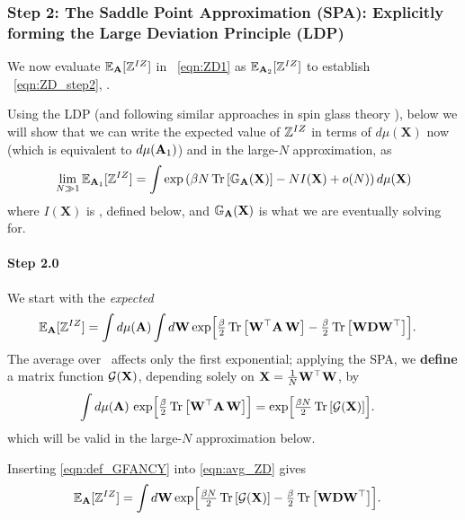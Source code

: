 \subsubsection{Step 2: The Saddle Point Approximation (SPA): Explicitly forming the Large Deviation Principle (LDP)}
\label{sxn:tanaka_step2}
We now evaluate $\mathbb{E}_{\mathbf{A}}[\mathbb{Z}^{IZ}]$ in \EQN~\ref{eqn:ZD1} as $\mathbb{E}_{\mathbf{A}_2}[\mathbb{Z}^{IZ}]$ 
to  establish \EQN~\ref{eqn:ZD_step2}, .

Using the LDP (and following similar approaches in spin glass theory \cite{PP95}),
below we will show that we can write the expected value of $\mathbb{Z}^{IZ}$ 
in terms of $d\mu(\mathbf{X})$ now (which is equivalent to $d\mu(\mathbf{A}_{1})$)
and in the large-$N$ approximation, as
\begin{equation}
  \label{eqn:LDP}
 \lim_{N \gg 1} \mathbb{E}_{\mathbf{A}_1}[\mathbb{Z}^{IZ}]=
  \int\exp\left(\beta N \mbox{}\operatorname{Tr}\left[\mathbb{G}_{\mathbf{A}}(\mathbf{X})\right]-NI(\mathbf{X})+o(N)\right)d\mu(\mathbf{X})
\end{equation}
where $I(\mathbf{X})$ is  \RateFunction, defined below,
and  $\mathbb{G}_{\mathbf{A}}(\mathbf{X})$ is what we are eventually solving for.

\paragraph{Step 2.0} We start with the \emph{expected} \PartitionFunction
\begin{align}
  \label{eqn:avg_ZD}
  \mathbb{E}_{\mathbf{A}}[\mathbb{Z}^{IZ}]
  &=
  \int d\mu(\mathbf{A})\int d{\mathbf{W}}
      \exp\Bigl[
         \tfrac{\beta}{2}\mbox{}\operatorname{Tr}\left[{\mathbf{W}}^{\top}\mathbf{A}\,{\mathbf{W}}\right]
        -\tfrac{\beta}{2}\mbox{}\operatorname{Tr}\left[{\mathbf{W}}\mathbf{D}{\mathbf{W}}^{\top}\right]
      \Bigr].
\end{align}
The average over \AMAT\ affects only the first exponential; applying the SPA, we
\textbf{define} a matrix function $\mathcal{G}(\mathbf{X})$, depending solely on
$\mathbf{X}=\frac1N{\mathbf{W}}^{\top}{\mathbf{W}}$, by
\begin{align}
  \label{eqn:def_GFANCY}
  \int d\mu(\mathbf{A})\,
        \exp\Bigl[\tfrac{\beta}{2}\mbox{}\operatorname{Tr}\left[{\mathbf{W}}^{\top}\mathbf{A}\,{\mathbf{W}}\right]\Bigr]
  &=
  \exp\Bigl[\tfrac{\beta N}{2}\mbox{}\operatorname{Tr}\left[\mathcal{G}(\mathbf{X})\right]\Bigr].
\end{align}
which will be valid in the large-$N$ approximation below.

Inserting \eqref{eqn:def_GFANCY} into \eqref{eqn:avg_ZD} gives
\begin{align}
  \label{eqn:ZD_after_Aavg}
  \mathbb{E}_{\mathbf{A}}[\mathbb{Z}^{IZ}]
  &=
  \int d{\mathbf{W}}
      \exp\Bigl[
         \tfrac{\beta N}{2}\mbox{}\operatorname{Tr}\left[\mathcal{G}(\mathbf{X})\right]
        -\tfrac{\beta}{2}\mbox{}\operatorname{Tr}\left[{\mathbf{W}}\mathbf{D}{\mathbf{W}}^{\top}\right]
      \Bigr].
\end{align}

